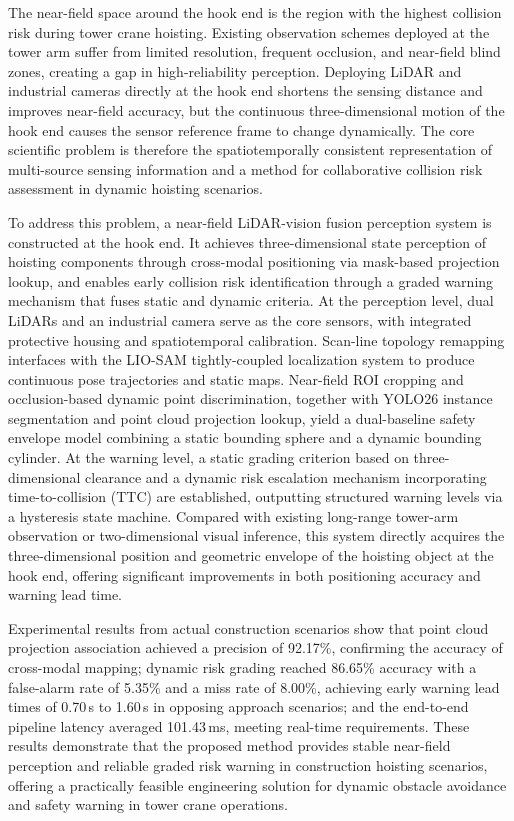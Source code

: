 \begin{eabstract}
  The near-field space around the hook end is the region with the highest collision risk during tower crane hoisting. Existing observation schemes deployed at the tower arm suffer from limited resolution, frequent occlusion, and near-field blind zones, creating a gap in high-reliability perception. Deploying LiDAR and industrial cameras directly at the hook end shortens the sensing distance and improves near-field accuracy, but the continuous three-dimensional motion of the hook end causes the sensor reference frame to change dynamically. The core scientific problem is therefore the spatiotemporally consistent representation of multi-source sensing information and a method for collaborative collision risk assessment in dynamic hoisting scenarios.

  To address this problem, a near-field LiDAR-vision fusion perception system is constructed at the hook end. It achieves three-dimensional state perception of hoisting components through cross-modal positioning via mask-based projection lookup, and enables early collision risk identification through a graded warning mechanism that fuses static and dynamic criteria. At the perception level, dual LiDARs and an industrial camera serve as the core sensors, with integrated protective housing and spatiotemporal calibration. Scan-line topology remapping interfaces with the LIO-SAM tightly-coupled localization system to produce continuous pose trajectories and static maps. Near-field ROI cropping and occlusion-based dynamic point discrimination, together with YOLO26 instance segmentation and point cloud projection lookup, yield a dual-baseline safety envelope model combining a static bounding sphere and a dynamic bounding cylinder. At the warning level, a static grading criterion based on three-dimensional clearance and a dynamic risk escalation mechanism incorporating time-to-collision (TTC) are established, outputting structured warning levels via a hysteresis state machine. Compared with existing long-range tower-arm observation or two-dimensional visual inference, this system directly acquires the three-dimensional position and geometric envelope of the hoisting object at the hook end, offering significant improvements in both positioning accuracy and warning lead time.

  Experimental results from actual construction scenarios show that point cloud projection association achieved a precision of 92.17\%, confirming the accuracy of cross-modal mapping; dynamic risk grading reached 86.65\% accuracy with a false-alarm rate of 5.35\% and a miss rate of 8.00\%, achieving early warning lead times of 0.70\,s to 1.60\,s in opposing approach scenarios; and the end-to-end pipeline latency averaged 101.43\,ms, meeting real-time requirements. These results demonstrate that the proposed method provides stable near-field perception and reliable graded risk warning in construction hoisting scenarios, offering a practically feasible engineering solution for dynamic obstacle avoidance and safety warning in tower crane operations.
\end{eabstract}

